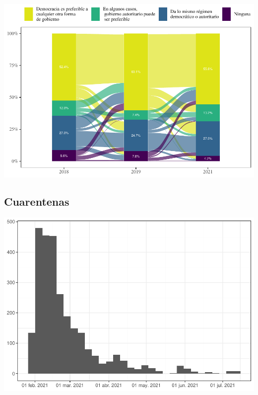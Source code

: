 \documentclass[
  12pt,
]{book}
\begin{document}
\begin{center}\includegraphics{reporte-elsoc_files/figure-latex/unnamed-chunk-23-1} \end{center}

\hypertarget{cuarentenas}{%
\subsection{Cuarentenas}\label{cuarentenas}}

\begin{center}\includegraphics{reporte-elsoc_files/figure-latex/hist-fecha-2021-1} \end{center}
\end{document}
